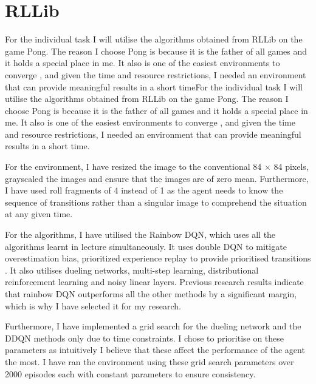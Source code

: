 \renewcommand{\thesection}{Advanced Task (Individual)}
\section{RLLib}
For the individual task I will utilise the algorithms obtained from RLLib on the game Pong. The reason I choose Pong is because it is the father of all games and it holds a special place in me. It also is one of the easiest environments to converge \cite{Pong}, and given the time and resource restrictions, I needed an environment that can provide meaningful results in a short timeFor the individual task I will utilise the algorithms obtained from RLLib on the game Pong. The reason I choose Pong is because it is the father of all games and it holds a special place in me. It also is one of the easiest environments to converge \cite{Pong}, and given the time and resource restrictions, I needed an environment that can provide meaningful results in a short time.

For the environment, I have resized the image to the conventional 84 $\times$ 84 pixels, grayscaled the images and ensure that the images are of zero mean. Furthermore, I have used roll fragments of 4 instead of 1 as the agent needs to know the sequence of transitions rather than a singular image to comprehend the situation at any given time.

For the algorithms, I have utilised the Rainbow DQN, which uses all the algorithms learnt in lecture simultaneously. It uses double DQN to mitigate overestimation bias, prioritized experience replay to provide prioritised transitions \cite{hessel2017rainbow}. It also utilises dueling networks, multi-step learning, distributional reinforcement learning and noisy linear layers. Previous research results indicate that rainbow DQN outperforms all the other methods by a significant margin, which is why I have selected it for my research.

Furthermore, I have implemented a grid search for the dueling network and the DDQN methods only due to time constraints. I chose to prioritise on these parameters as intuitively I believe that these affect the performance of the agent the most. I have ran the environment using these grid search parameters over 2000 episodes each with constant parameters to ensure consistency.

